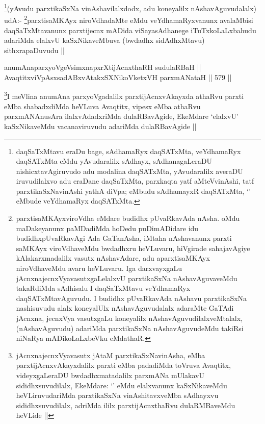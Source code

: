 \begin{artha}
\footnote{daqSaTxMtavu eraDu bage, sAdhamaRyx daqSATxMta, veYdhamaRyx daqSATxMta eMdu yAvudaralilx sAdhayx, sAdhanagaLeraDU nishicxtavAgiruvudo adu modalina daqSATxMta, yAvudaralilx averaDU iruvudilalxvo adu eraDane daqSaTxMta, parxkaqta yatf aMteVvinAshi, tatf parxtikaSxNavinAshi yathA diVpa; eMbudu sAdhamayxR daqSATxMta, `\stext' eMbude veYdhamaRyx daqSATxMta.}(yAvudu parxtikaSxNa vinAshavilalxdodx, adu koneyalilx nAshavAguvudalalx) udA:- \footnote{parxtisaMKAyxviroVdha eMdare budidhx pUvaRkavAda nAsha. oMdu maDakeyanunx paMDadiMda hoDedu puDimADidare idu budidhxpUvaRkavAgi Ada GaTanAsha, iMtaha nAshavanunx parxti saMKAyx viroVdhaveMdu bwdadhxru heVLuvaru, hiVgirade sahajavAgiye kAlakarxmadalilx vasutx nAshavAdare, adu aparxtisaMKAyx niroVdhaveMdu avaru heVLuvaru. Iga darxvayxgaLu jAcnxnajecnxVyavasutxgaLelalxvU parxtikaSxNa nAshavAguvaveMdu takaRdiMda sAdhisalu I daqSaTxMtavu veYdhamaRyx daqSATxMtavAguvudu. I budidhx pUvaRkavAda nAshavu parxtikaSxNa nashisuvudu alalx koneyalUlx nAshavAguvudalalx adaraMte GaTAdi jAcnxna, jecnxVya vasutxgaLu koneyalilx nAshavAguvudilalxveMtalalx, (nAshavAguvudu) adariMda parxtikaSxNa nAshavAguvudeMdu takiRsi niNaRya mADikoLaLxbeVku eMdathaR.}parxtisaMKAyx niroVdhadaMte eMdu veYdhamaRyxvanunx avalaMbisi daqSaTxMtavanunx parxtijecnx mADida viSayasAdhanege iTuTxkoLaLxbahudu adariMda elalxvU kaSxNikaveMbuva (bwdadhx sidAdhxMtavu) sithxrapaDuvudu ||
\end{artha}

\begin{shl}
anumAnaparxyoVgeV\s simxnapxrXtijAcnxthaRH sudulaRBaH || \\
AvaqtitxviVpAsxsadABxvAtakxSXNikoVketxVH parxmANataH ||  579 ||  
\end{shl}

\begin{artha}
\footnote{jAcnxnajecnxVyavasutx jAtaM parxtikaSxNavinAsha, eMba parxtijAcnxvAkayxdalilx parxti eMba padadiMda toVruva Avaqtitx, videyxgaLeraDU bwdadhxmatadalilx parxmANa mUlakavU sididhxsuvudilalx, EkeMdare: `\stext' eMdu elalxvanunx kaSxNikaveMdu heVLiruvudariMda parxtikaSxNa vinAshitavxveMba sAdhayxvu sididhxsuvudilalx, adriMda ililx parxtijAcnxthaRvu dulaRMBaveMdu heVLide ||}I meVlina anumAna parxyoVgadalilx parxtijAcnxvAkayxda athaRvu parxti eMba shabadxdiMda heVLuva Avaqtitx, vipesx eMba athaRvu parxmANAnusAra ilalxvAdadxriMda dulaRBavAgide, EkeMdare `elalxvU' kaSxNikaveMdu vacanaviruvudu adariMda dulaRBavAgide ||
\end{artha}

